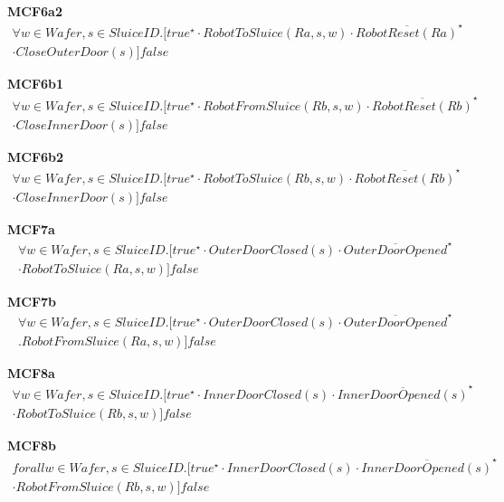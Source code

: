 \documentclass[12pt]{report}
\begin{document}
    \textbf{MCF6a2}
    \begin{multline*}
        \forall w \in \mathit{Wafer}, s \in SluiceID.[true^{\star} \cdot RobotToSluice(Ra,s,w) \cdot \overline{RobotReset(Ra)}^{\star} \\
        \cdot CloseOuterDoor(s)]false
    \end{multline*}
	
    \textbf{MCF6b1}
    \begin{multline*}
        \forall w \in \mathit{Wafer}, s \in SluiceID.[true^{\star} \cdot RobotFromSluice(Rb,s,w) \cdot \overline{RobotReset(Rb)}^{\star}\\
        \cdot CloseInnerDoor(s)]false
    \end{multline*}

    \textbf{MCF6b2}
    \begin{multline*}
        \forall w \in \mathit{Wafer}, s \in SluiceID.[true^{\star} \cdot RobotToSluice(Rb,s,w) \cdot \overline{RobotReset(Rb)}^{\star} \\
        \cdot CloseInnerDoor(s)]false
    \end{multline*}

    \textbf{MCF7a}
    \begin{multline*}
        \forall w \in \mathit{Wafer}, s \in SluiceID.[true^{\star} \cdot OuterDoorClosed(s) \cdot \overline{OuterDoorOpened}^{\star} \\
        \cdot RobotToSluice(Ra,s,w)]false
    \end{multline*}

    \textbf{MCF7b}
    \begin{multline*}
        \forall w \in \mathit{Wafer}, s \in SluiceID.[true^{\star} \cdot OuterDoorClosed(s) \cdot \overline{OuterDoorOpened}^{\star} \\
        .RobotFromSluice(Ra,s,w)]false
    \end{multline*}

    \textbf{MCF8a}
    \begin{multline*}
        \forall w \in \mathit{Wafer}, s \in SluiceID.[true^{\star} \cdot InnerDoorClosed(s) \cdot \overline{InnerDoorOpened(s)}^{\star} \\
        \cdot RobotToSluice(Rb, s, w)]false
    \end{multline*}

    \textbf{MCF8b}
    \begin{multline*}
        forall w \in \mathit{Wafer}, s \in SluiceID.[true^{\star} \cdot InnerDoorClosed(s) \cdot \overline{InnerDoorOpened(s)}^{\star} \\
        \cdot RobotFromSluice(Rb, s, w)]false
    \end{multline*}
\end{document}
